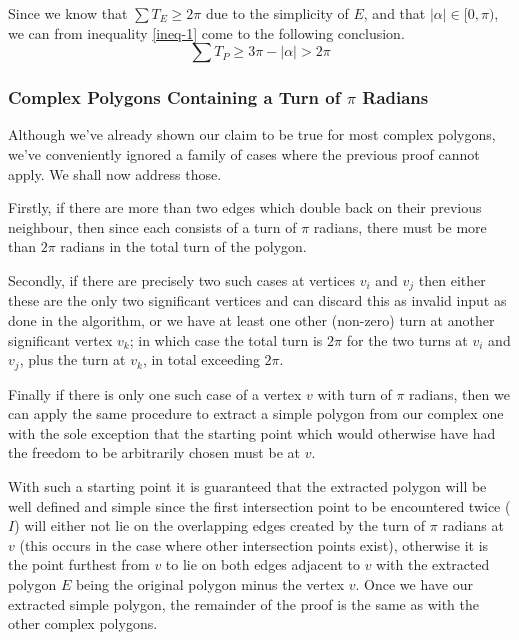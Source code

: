 \documentclass{article}
\begin{document}
Since we know that \(\sum T_E \geq 2\pi\) due to the simplicity of \(E\), and that \(|\alpha| \in [0, \pi)\), we can from inequality \ref{ineq-1} come to the following conclusion.
\begin{equation}
	\sum T_P \geq 3\pi - |\alpha| > 2\pi
\end{equation}

\subsubsection{Complex Polygons Containing a Turn of \(\pi\) Radians} \label{overlapping-edges}

Although we've already shown our claim to be true for most complex polygons, we've conveniently ignored a family of cases where the previous proof cannot apply. We shall now address those.

Firstly, if there are more than two edges which double back on their previous neighbour, then since each consists of a turn of \(\pi\) radians, there must be more than \(2\pi\) radians in the total turn of the polygon.

Secondly, if there are precisely two such cases at vertices \(v_i\) and \(v_j\) then either these are the only two significant vertices and can discard this as invalid input as done in the algorithm, or we have at least one other (non-zero) turn at another significant vertex \(v_k\); in which case the total turn is \(2\pi\) for the two turns at \(v_i\) and \(v_j\), plus the turn at \(v_k\), in total exceeding \(2\pi\).

Finally if there is only one such case of a vertex \(v\) with turn of \(\pi\) radians, then we can apply the same procedure to extract a simple polygon from our complex one with the sole exception that the starting point which would otherwise have had the freedom to be arbitrarily chosen must be at \(v\).

With such a starting point it is guaranteed that the extracted polygon will be well defined and simple since the first intersection point to be encountered twice (\(I\)) will either not lie on the overlapping edges created by the turn of \(\pi\) radians at \(v\) (this occurs in the case where other intersection points exist), otherwise it is the point furthest from \(v\) to lie on both edges adjacent to \(v\) with the extracted polygon \(E\) being the original polygon minus the vertex \(v\). Once we have our extracted simple polygon, the remainder of the proof is the same as with the other complex polygons.
\end{document}

